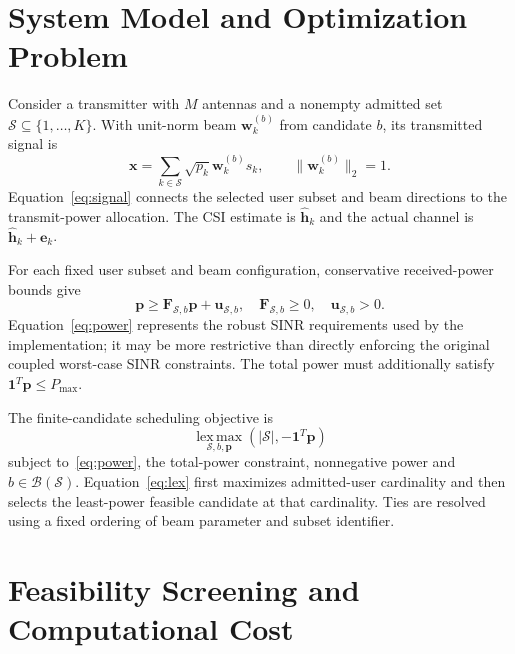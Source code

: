 \documentclass[journal]{IEEEtran}
\begin{document}
\section{System Model and Optimization Problem}
Consider a transmitter with $M$ antennas and a nonempty admitted set $\mathcal S\subseteq\{1,\ldots,K\}$. With unit-norm beam $\mathbf w_k^{(b)}$ from candidate $b$, its transmitted signal is
\begin{equation}
\mathbf x=\sum_{k\in\mathcal S}\sqrt{p_k}\mathbf w_k^{(b)}s_k,
\qquad\|\mathbf w_k^{(b)}\|_2=1.
\label{eq:signal}
\end{equation}
Equation~\eqref{eq:signal} connects the selected user subset and beam directions to the transmit-power allocation. The CSI estimate is $\widehat{\mathbf h}_k$ and the actual channel is $\widehat{\mathbf h}_k+\mathbf e_k$.

For each fixed user subset and beam configuration, conservative received-power bounds give
\begin{equation}
\mathbf p\geq\mathbf F_{\mathcal S,b}\mathbf p+\mathbf u_{\mathcal S,b},
\quad\mathbf F_{\mathcal S,b}\geq0,\quad\mathbf u_{\mathcal S,b}>0.
\label{eq:power}
\end{equation}
Equation~\eqref{eq:power} represents the robust SINR requirements used by the implementation; it may be more restrictive than directly enforcing the original coupled worst-case SINR constraints. The total power must additionally satisfy $\mathbf1^T\mathbf p\leq P_{\max}$.

The finite-candidate scheduling objective is
\begin{equation}
\operatorname*{lex\,max}_{\mathcal S,b,\mathbf p}
\left(|\mathcal S|,-\mathbf1^T\mathbf p\right)
\label{eq:lex}
\end{equation}
subject to~\eqref{eq:power}, the total-power constraint, nonnegative power and $b\in\mathcal B(\mathcal S)$. Equation~\eqref{eq:lex} first maximizes admitted-user cardinality and then selects the least-power feasible candidate at that cardinality. Ties are resolved using a fixed ordering of beam parameter and subset identifier.

\section{Feasibility Screening and Computational Cost}
\end{document}
